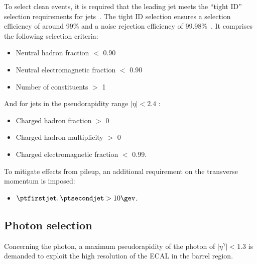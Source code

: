 To select clean \GAMJET events, it is required that the leading jet meets the ``tight ID'' selection requirements for jets~\cite{bib:JetIDRecommendation_7TeV,bib:AN:JetId_8TeV}.
The tight ID selection ensures a selection efficiency of around 99\% and a noise rejection efficiency of 99.98\%~\cite{bib:JetIDRecommendation_7TeV}.
It comprises the following selection criteria:
\begin{itemize}
 \item Neutral hadron fraction $<$ 0.90
 \item Neutral electromagnetic fraction $<$ 0.90
 \item Number of constituents $>$ 1
\end{itemize}
\newpage
 And for jets in the pseudorapidity range $|\eta| < 2.4 $ :
\begin{itemize}
 \item Charged hadron fraction $>$ 0
 \item Charged hadron multiplicity $>$ 0
 \item Charged electromagnetic fraction $<$ 0.99.
\end{itemize}

To mitigate effects from pileup, an additional requirement on the  transverse momentum is imposed:
\begin{itemize}
\item $\ptfirstjet,\ptsecondjet>10\gev$.
\end{itemize}

\subsection*{Photon selection}
Concerning the photon, a maximum pseudorapidity of the photon of $|\eta^{\gamma}| < 1.3$ is demanded to exploit the high resolution of the ECAL in the barrel region.

